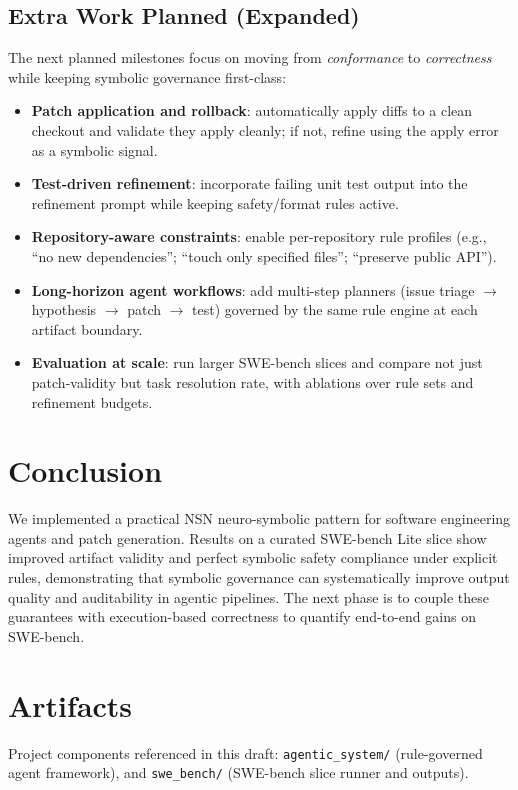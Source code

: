 \documentclass[conference]{IEEEtran}
\begin{document}
\subsection{Extra Work Planned (Expanded)}
The next planned milestones focus on moving from \emph{conformance} to \emph{correctness} while keeping symbolic governance first-class:
\begin{itemize}
  \item \textbf{Patch application and rollback}: automatically apply diffs to a clean checkout and validate they apply cleanly; if not, refine using the apply error as a symbolic signal.
  \item \textbf{Test-driven refinement}: incorporate failing unit test output into the refinement prompt while keeping safety/format rules active.
  \item \textbf{Repository-aware constraints}: enable per-repository rule profiles (e.g., ``no new dependencies''; ``touch only specified files''; ``preserve public API'').
  \item \textbf{Long-horizon agent workflows}: add multi-step planners (issue triage $\rightarrow$ hypothesis $\rightarrow$ patch $\rightarrow$ test) governed by the same rule engine at each artifact boundary.
  \item \textbf{Evaluation at scale}: run larger SWE-bench slices and compare not just patch-validity but task resolution rate, with ablations over rule sets and refinement budgets.
\end{itemize}

\section{Conclusion}
We implemented a practical NSN neuro-symbolic pattern for software engineering agents and patch generation. Results on a curated SWE-bench Lite slice show improved artifact validity and perfect symbolic safety compliance under explicit rules, demonstrating that symbolic governance can systematically improve output quality and auditability in agentic pipelines. The next phase is to couple these guarantees with execution-based correctness to quantify end-to-end gains on SWE-bench.

\section*{Artifacts}
Project components referenced in this draft:
\texttt{agentic\_system/} (rule-governed agent framework), and \texttt{swe\_bench/} (SWE-bench slice runner and outputs).
\end{document}
